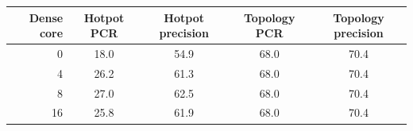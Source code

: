 \begin{tabular}{@{}rcccc@{}}
\toprule
Dense core & Hotpot PCR & Hotpot precision & Topology PCR & Topology precision \\
\midrule
0 & 18.0 & 54.9 & 68.0 & 70.4 \\
4 & 26.2 & 61.3 & 68.0 & 70.4 \\
8 & 27.0 & 62.5 & 68.0 & 70.4 \\
16 & 25.8 & 61.9 & 68.0 & 70.4 \\
\bottomrule
\end{tabular}

